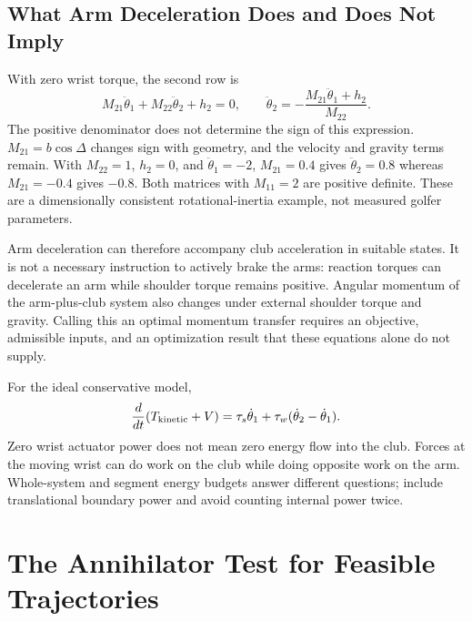 \subsection{What Arm Deceleration Does and Does Not Imply}

With zero wrist torque, the second row is
\begin{equation}
M_{21}\ddot\theta_1+M_{22}\ddot\theta_2+h_2=0,
\qquad
\ddot\theta_2=-\frac{M_{21}\ddot\theta_1+h_2}{M_{22}}.
\label{eq:pend_unactuated}
\end{equation}
The positive denominator does not determine the sign of this expression.
$M_{21}=b\cos\Delta$ changes sign with geometry, and the velocity and gravity
terms remain. With $M_{22}=1$, $h_2=0$, and $\ddot\theta_1=-2$,
$M_{21}=0.4$ gives $\ddot\theta_2=0.8$ whereas $M_{21}=-0.4$ gives $-0.8$.
Both matrices with $M_{11}=2$ are positive definite. These are a dimensionally
consistent rotational-inertia example, not measured golfer parameters.

Arm deceleration can therefore accompany club acceleration in suitable states.
It is not a necessary instruction to actively brake the arms: reaction torques
can decelerate an arm while shoulder torque remains positive. Angular momentum
of the arm-plus-club system also changes under external shoulder torque and
gravity. Calling this an optimal momentum transfer requires an objective,
admissible inputs, and an optimization result that these equations alone do not supply.

For the ideal conservative model,
\begin{equation}
\frac{d}{dt}(T_{\rm kinetic}+V)
=\tau_s\dot\theta_1+\tau_w(\dot\theta_2-\dot\theta_1).
\end{equation}
Zero wrist actuator power does not mean zero energy flow into the club.
Forces at the moving wrist can do work on the club while doing opposite work
on the arm. Whole-system and segment energy budgets answer different questions;
include translational boundary power and avoid counting internal power twice.

\section{The Annihilator Test for Feasible Trajectories}

